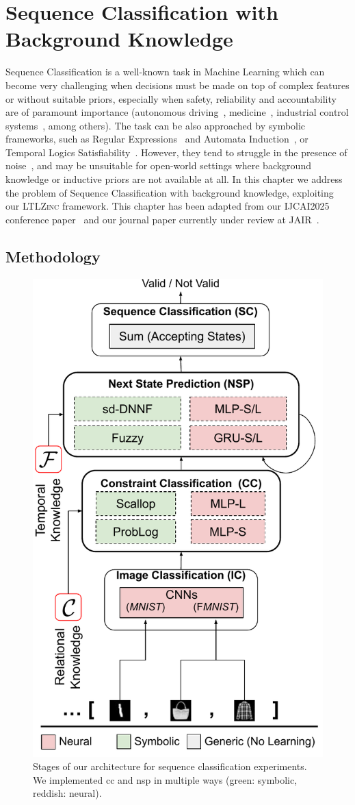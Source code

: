 \chapter{Sequence Classification with Background Knowledge}
\label{chap:ltlzincseq}

Sequence Classification is a well-known task in Machine Learning which can become very challenging when decisions must be made on top of complex features or without suitable priors, especially when safety, reliability and accountability are of paramount importance (autonomous driving~\cite{roesener2016scenario}, medicine~\cite{ivaturi2021comprehensive}, industrial control systems~\cite{chakraborty2022device}, among others).
%
The task can be also approached by symbolic frameworks, such as Regular Expressions~\cite{galassi2005learning} and Automata Induction~\cite{angluin1982inference}, or Temporal Logics Satisfiability~\cite{rozier2007ltl}. However, they tend to struggle in the presence of noise~\cite{umili2024deepdfa}, and may be unsuitable for open-world settings where background knowledge or %
inductive priors are not available at all.
In this chapter we address the problem of Sequence Classification with background knowledge, exploiting our \textsc{LTLZinc} framework. 
This chapter has been adapted from our IJCAI2025 conference paper~\cite{lorello2025neuro} and our journal paper currently under review at JAIR~\cite{lorello2025ltlzinc}.


\section{Methodology}
\label{ltlzinc:sec:setup}

\begin{figure}
	\centering
	\includegraphics[width=0.4\linewidth]{imgs/ltlzinc/Zinc_fig.pdf}
	\caption[Modular architecture for LTLZinc]{Stages of our architecture for sequence classification experiments. We implemented {\sc cc} and {\sc nsp} in multiple ways (green: symbolic, reddish: neural).}
	\label{ltlzinc:fig:pipeline}
\end{figure}

